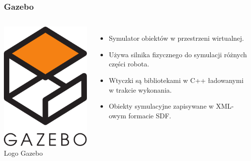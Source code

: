 \documentclass{beamer}
\begin{document}
	\begin{frame}
		\frametitle{Gazebo}
		\begin{columns}[c]
			\centering
			\includegraphics[width=\textwidth]{graphics/gazebo_logo.png} \\
			Logo Gazebo\footnotemark
			\begin{itemize}
				\item Symulator obiektów w przestrzeni wirtualnej.
				\item Używa silnika fizycznego do symulacji różnych części robota.
				\item Wtyczki są bibliotekami w C++ ładowanymi w trakcie wykonania.
				\item Obiekty symulacyjne zapisywane w XML-owym formacie SDF.
			\end{itemize}
		\end{columns}
	\end{frame}
\end{document}
